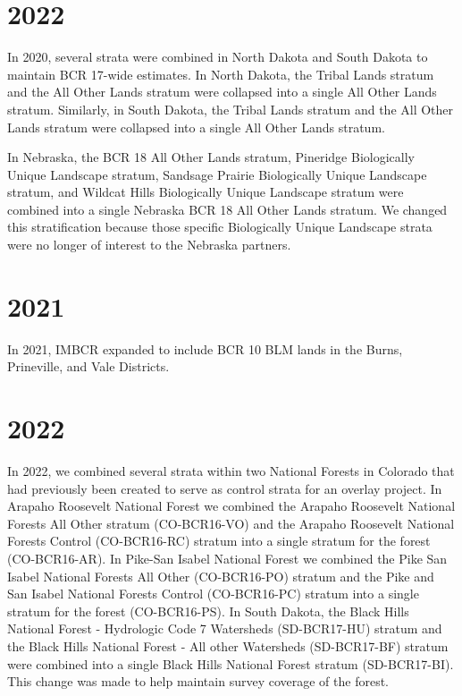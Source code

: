 \documentclass[
  letterpaper,
  DIV=11,
  numbers=noendperiod,
  oneside]{scrreprt}
\begin{document}
\hypertarget{section-11}{%
\section*{\texorpdfstring{\textbf{2022}}{2022}}\label{section-11}}


In 2020, several strata were combined in North Dakota and South Dakota
to maintain BCR 17-wide estimates. In North Dakota, the Tribal Lands
stratum and the All Other Lands stratum were collapsed into a single All
Other Lands stratum. Similarly, in South Dakota, the Tribal Lands
stratum and the All Other Lands stratum were collapsed into a single All
Other Lands stratum.

In Nebraska, the BCR 18 All Other Lands stratum, Pineridge Biologically
Unique Landscape stratum, Sandsage Prairie Biologically Unique Landscape
stratum, and Wildcat Hills Biologically Unique Landscape stratum were
combined into a single Nebraska BCR 18 All Other Lands stratum. We
changed this stratification because those specific Biologically Unique
Landscape strata were no longer of interest to the Nebraska partners.

\hypertarget{section-12}{%
\section*{\texorpdfstring{\textbf{2021}}{2021}}\label{section-12}}


In 2021, IMBCR expanded to include BCR 10 BLM lands in the Burns,
Prineville, and Vale Districts.

\hypertarget{section-13}{%
\section*{\texorpdfstring{\textbf{2022}}{2022}}\label{section-13}}


In 2022, we combined several strata within two National Forests in
Colorado that had previously been created to serve as control strata for
an overlay project. In Arapaho Roosevelt National Forest we combined the
Arapaho Roosevelt National Forests All Other stratum (CO-BCR16-VO) and
the Arapaho Roosevelt National Forests Control (CO-BCR16-RC) stratum
into a single stratum for the forest (CO-BCR16-AR). In Pike-San Isabel
National Forest we combined the Pike San Isabel National Forests All
Other (CO-BCR16-PO) stratum and the Pike and San Isabel National Forests
Control (CO-BCR16-PC) stratum into a single stratum for the forest
(CO-BCR16-PS). In South Dakota, the Black Hills National Forest -
Hydrologic Code 7 Watersheds (SD-BCR17-HU) stratum and the Black Hills
National Forest - All other Watersheds (SD-BCR17-BF) stratum were
combined into a single Black Hills National Forest stratum
(SD-BCR17-BI). This change was made to help maintain survey coverage of
the forest.
\end{document}
